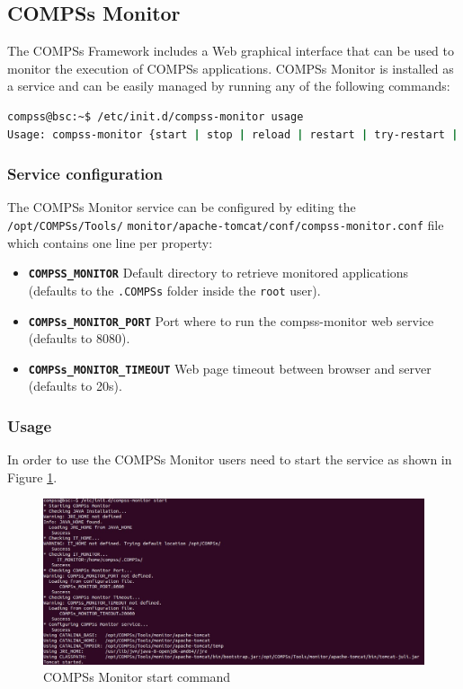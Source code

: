 \subsection{COMPSs Monitor}
\label{subsec:monitor}
The COMPSs Framework includes a Web graphical interface that can be used to monitor the execution of COMPSs applications. COMPSs Monitor is installed as a service and can be easily managed by running any of the following
commands:
\begin{lstlisting}[language=bash]
compss@bsc:~$ /etc/init.d/compss-monitor usage
Usage: compss-monitor {start | stop | reload | restart | try-restart | force-reload | status}
\end{lstlisting}

\subsubsection{Service configuration}
The COMPSs Monitor service can be configured by editing the \texttt{/opt/COMPSs/Tools/}
\texttt{monitor/apache-tomcat/conf/compss-monitor.conf}
file which contains one line per property:
\begin{itemize}
 \item \texttt{\textbf{COMPSS\_MONITOR}} Default directory to retrieve monitored applications (defaults to the \texttt{.COMPSs} folder inside the \texttt{root} user).
 \item \texttt{\textbf{COMPSs\_MONITOR\_PORT}} Port where to run the compss-monitor web service (defaults to 8080).
 \item \texttt{\textbf{COMPSs\_MONITOR\_TIMEOUT}} Web page timeout between browser and server (defaults to 20s).
\end{itemize}

\subsubsection{Usage}
In order to use the COMPSs Monitor users need to start the service as shown in Figure \ref{fig:monitor_start}.
\begin{figure}[thb!]
  \centering
    \includegraphics[width=\textwidth]{./Sections/4_Tools/Figures/monitor_start.jpeg}
    \caption{COMPSs Monitor start command}
    \label{fig:monitor_start}
\end{figure}

